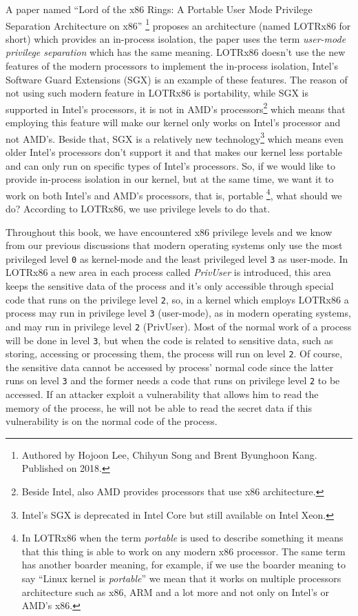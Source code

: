 A paper named ``Lord of the x86 Rings: A Portable User Mode Privilege
Separation Architecture on x86'' \footnote{Authored by Hojoon Lee,
  Chihyun Song and Brent Byunghoon Kang. Published on 2018.} proposes an
architecture (named LOTRx86 for short) which provides an in-process
isolation, the paper uses the term \emph{user-mode privilege separation}
which has the same meaning. LOTRx86 doesn't use the new features of the
modern processors to implement the in-process isolation, Intel's
Software Guard Extensions (SGX) is an example of these features. The
reason of not using such modern feature in LOTRx86 is portability, while
SGX is supported in Intel's processors, it is not in AMD's
processors\footnote{Beside Intel, also AMD provides processors that use
  x86 architecture.} which means that employing this feature will make
our kernel only works on Intel's processor and not AMD's. Beside that,
SGX is a relatively new technology\footnote{Intel's SGX is deprecated in
  Intel Core but still available on Intel Xeon.} which means even older
Intel's processors don't support it and that makes our kernel less
portable and can only run on specific types of Intel's processors. So,
if we would like to provide in-process isolation in our kernel, but at
the same time, we want it to work on both Intel's and AMD's processors,
that is, portable \footnote{In LOTRx86 when the term \emph{portable} is
  used to describe something it means that this thing is able to work on
  any modern x86 processor. The same term has another boarder meaning,
  for example, if we use the boarder meaning to say ``Linux kernel is
  \emph{portable}'' we mean that it works on multiple processors
  architecture such as x86, ARM and a lot more and not only on Intel's
  or AMD's x86.}, what should we do? According to LOTRx86, we use
privilege levels to do that.

Throughout this book, we have encountered x86 privilege levels and we
know from our previous discussions that modern operating systems only
use the most privileged level \lstinline!0! as kernel-mode and the least
privileged level \lstinline!3! as user-mode. In LOTRx86 a new area in
each process called \emph{PrivUser} is introduced, this area keeps the
sensitive data of the process and it's only accessible through special
code that runs on the privilege level \lstinline!2!, so, in a kernel
which employs LOTRx86 a process may run in privilege level \lstinline!3!
(user-mode), as in modern operating systems, and may run in privilege
level \lstinline!2! (PrivUser). Most of the normal work of a process
will be done in level \lstinline!3!, but when the code is related to
sensitive data, such as storing, accessing or processing them, the
process will run on level \lstinline!2!. Of course, the sensitive data
cannot be accessed by process' normal code since the latter runs on
level \lstinline!3! and the former needs a code that runs on privilege
level \lstinline!2! to be accessed. If an attacker exploit a
vulnerability that allows him to read the memory of the process, he will
not be able to read the secret data if this vulnerability is on the
normal code of the process.

